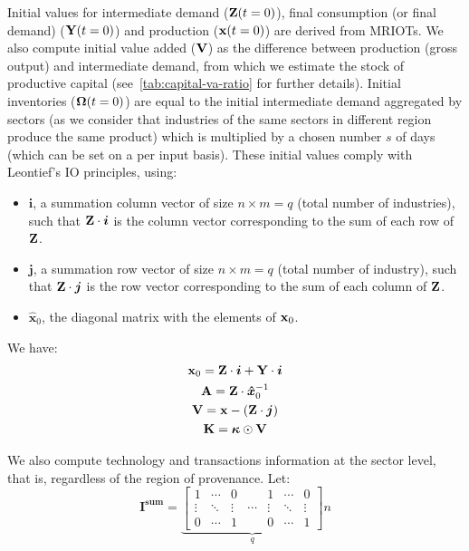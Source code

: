 \documentclass[main.tex]{subfiles}
\begin{document}
Initial values for intermediate demand ($\mathbf{Z}(t=0)$), final consumption (or final demand)
($\mathbf{Y}(t=0)$) and production ($\mathbf{x}(t=0)$) are derived from MRIOTs. We also
compute initial value added ($\mathbf{V}$) as the difference between production (gross
output) and intermediate demand, from which we estimate the stock of productive
capital (see~\cref{tab:capital-va-ratio} for further details). Initial
inventories ($\mathbf{\Omega}(t=0)$) are equal to the initial intermediate demand aggregated
by sectors (as we consider that industries of the same sectors in different region
produce the same product) which is multiplied by a chosen number $s$ of days (which can
be set on a per input basis). These initial values comply with Leontief's IO
principles, using:
\begin{itemize}
\item $\bm{i}$, a summation column vector of size $n \times m = q$ (total
  number of industries), such that $\mathbf{Z} \cdot \bm{i}$ is the column vector corresponding to the
  sum of each row of $\mathbf{Z}$.
\item $\bm{j}$, a summation row vector of size $n \times m = q$ (total number
  of industry), such that $\mathbf{Z} \cdot \bm{j}$ is the row vector corresponding to the
  sum of each column of $\mathbf{Z}$.
\item $\bm{\hat{x}}_0$, the diagonal matrix with the elements of $\mathbf{x}_0$.
\end{itemize}

We have:
\begin{gather*}
  \mathbf{x}_0 = \mathbf{Z} \cdot \bm{i} + \mathbf{Y} \cdot \bm{i}\\
  \mathbf{A} = \mathbf{Z} \cdot \bm{\hat{x}}_0^{-1}\\
  \mathbf{V} = \mathbf{x} - \left ( \mathbf{Z} \cdot \bm{j} \right )\\
  \mathbf{K} = \bm{\kappa} \odot \mathbf{V}
\end{gather*}



We also compute technology and transactions information at the sector level,
that is, regardless of the region of provenance. Let:
\[
  \bm{I^{\textrm{sum}}} =
  \underbrace{
    \begin{bmatrix}
      1 & \cdots & 0 & & 1 & \cdots & 0 \\
      \vdots & \ddots & \vdots & \cdots & \vdots & \ddots & \vdots \\
      0 & \cdots & 1 & & 0 & \cdots & 1
    \end{bmatrix}
  }_{q} n
\]
\end{document}
